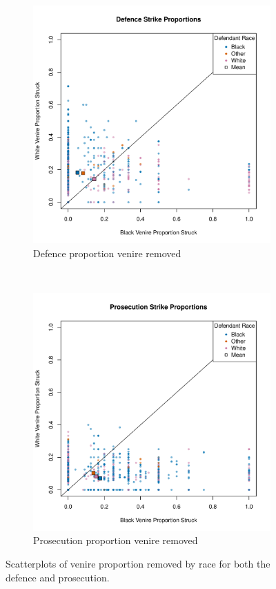 \documentclass[12pt]{article}
\begin{document}
\begin{figure}[h!]
  \centering
  \begin{subfigure}{0.45\textwidth}
    \includegraphics[scale = 0.45]{DefStrProp}
    \caption{\footnotesize Defence proportion venire removed}
    \label{fig:defraceprop}
  \end{subfigure}
  ~
  \begin{subfigure}{0.45\textwidth}
    \includegraphics[scale = 0.45]{ProStrProp}
    \caption{\footnotesize Prosecution proportion venire removed}
    \label{fig:proraceprop}
  \end{subfigure}
  \caption[Racial Strike Proportions by Party]
  {\footnotesize Scatterplots of venire proportion removed by race for both the defence and prosecution.}
  \label{fig:defproprop}
\end{figure}
\end{document}
